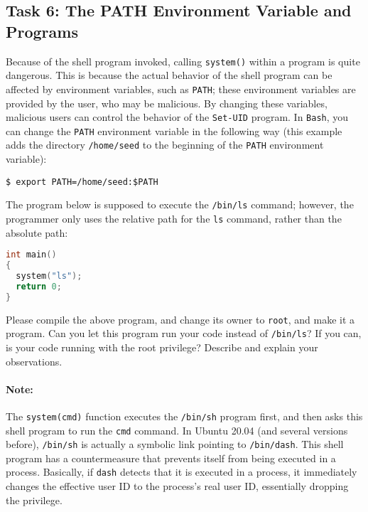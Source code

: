 \subsection{Task 6: The PATH Environment Variable and \setuid Programs}

Because of the shell program invoked, calling {\tt system()}
within a \setuid program is quite dangerous. This is because the actual behavior of the
shell program can be affected by environment variables, such
as {\tt PATH}; these environment variables are provided by the user, who
may be malicious.  By changing these variables, malicious users can control
the behavior of the {\tt Set-UID} program. In {\tt Bash}, you can
change the {\tt PATH} environment variable in the following way (this example
adds the directory {\tt /home/seed} to the beginning of the {\tt PATH} environment variable):


\begin{lstlisting}
$ export PATH=/home/seed:$PATH
\end{lstlisting}



The \setuid program below is supposed to execute the {\tt /bin/ls} command;
however, the programmer only uses the relative path for the {\tt ls}
command, rather than the absolute path:

\begin{lstlisting}[language=C]
int main()
{
  system("ls");
  return 0;
}
\end{lstlisting}

Please compile the above program, and change its owner to {\tt root}, and
make it a \setuid program.  Can you let this \setuid program run your code instead of
{\tt /bin/ls}?  If you can, is your code running with the root privilege?
Describe and explain your observations. \\


\paragraph{Note:}
The \texttt{system(cmd)} function executes the \texttt{/bin/sh} program first, and then
asks this shell program to run the \texttt{cmd} command.
In Ubuntu 20.04 (and several versions before), \texttt{/bin/sh} is actually
a symbolic link pointing to \texttt{/bin/dash}.
This shell program has a countermeasure that prevents itself
from being executed in a \setuid process.  Basically, if \texttt{dash} detects that it is
executed in a \setuid process, it immediately changes the effective user ID to the process's
real user ID, essentially dropping the privilege.


